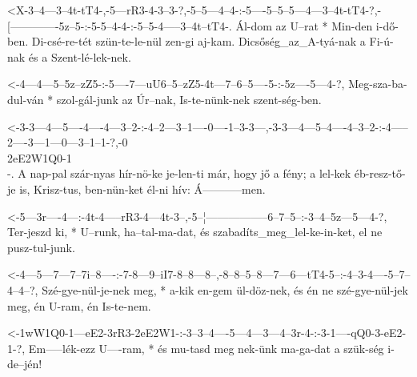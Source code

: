   {<X-3--4---3--4t-tT4-,-5---rR3-4-3--3-?,-5--5---4--4-:-5----5--5--5---4---3--4t-tT4-?,-[-------------5z--5-:-5-5--4-4-:-5--5-4-----3--4t--tT4-.}
  {   Ál-dom az U--rat * Min-den i-dő-ben. Di-csé-re-tét szün-te-le-nül zen-gi aj-kam.   Dicsőség_az_A-tyá-nak a Fi-ú-nak és a Szent-lé-lek-nek.}

  {<-4---4---5--5z--zZ5-:-5----7---uU6--5--zZ5-4t---7--6--5----5-:-5z----5---4-?,}
  {  Meg-sza-ba-dul-ván * szol-gál-junk az Úr--nak, Is-te-nünk-nek szent-ség-ben.}



  {<-3-3---4---5----4----4---3--2-:-4--2---3--1----0----1--3-3---,-3-3---4---5--4----4--3--2-:-4-----2----3---1---0---3--1--1-?,-0\\2eE2W1Q0-1\\-.}
  {  A nap-pal szár-nyas hír-nö-ke  je-len-ti már, hogy jő a fény; a lel-kek éb-resz-tő-je is, Krisz-tus, ben-nün-ket él-ni hív: Á-----------men.}

  {<-5---3r----4---:-4t-4-----rR3-4---4t-3--,-5--¦-----------------6--7--5--:-3--4--5z---5---4-?,}
  {  Ter-jeszd ki, * U--runk, ha--tal-ma-dat, és szabadíts_meg_lel-ke-in-ket, el ne pusz-tul-junk.}

  {<-4---5---7---7--7i--8----:-7-8---9--iI7-8--8---8--,-8--8--5--8---7---6---tT4-5--:-4--3-4----5--7--4--4--?,}
  {  Szé-gye-nül-je-nek meg, * a-kik en-gem ül-döz-nek, és én ne szé-gye-nül-jek meg, én U-ram, én Is-te-nem.}

  {<-1wW1Q0-1---eE2-3rR3-2eE2W1-:-3--3--4----5---4---3---4--3r-4-:-3-1----qQ0-3-eE2-1-?,}
  {  Em-----lék-ezz U----ram,   * és mu-tasd meg nek-ünk ma-ga-dat a szük-ség i-de--jén!}


